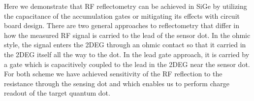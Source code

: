 \documentclass[]{article}
\begin{document}
	Here we demonstrate that RF reflectometry can be achieved in SiGe by utilizing the capacitance of the accumulation gates or  mitigating its effects with circuit board design.  There are two general approaches to reflectometry that differ in how the measured RF signal is carried to the lead of the sensor dot.  In the ohmic style, the signal enters the 2DEG through an ohmic contact so that it carried in the 2DEG itself all the way to the dot.  In the lead gate approach, it is carried by a gate which is capacitively coupled to the lead in the 2DEG near the sensor dot. For both scheme we have achieved sensitivity of the RF reflection to the resistance through the sensing dot and which enables us to perform charge readout of the target quantum dot. %
	
%
%
%
%
%
\end{document}
